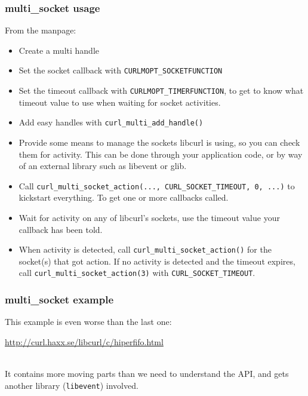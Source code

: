\documentclass[aspectratio=43]{beamer}
\newenvironment{changemargin}[1]{%
  \begin{list}{}{%
    \setlength{\topsep}{0pt}%
    \setlength{\leftmargin}{#1}%
    \setlength{\rightmargin}{1em}
    \setlength{\listparindent}{\parindent}%
    \setlength{\itemindent}{\parindent}%
    \setlength{\parsep}{\parskip}%
  }%
  \item[]}{\end{list}}
\begin{document}
\begin{frame}

  \frametitle{multi\_socket usage}

\begin{changemargin}{1cm}
From the manpage:
\small
\begin{itemize}
\item Create a multi handle

\item Set the socket callback with {\tt CURLMOPT\_SOCKETFUNCTION}

\item Set the timeout callback with {\tt CURLMOPT\_TIMERFUNCTION}, to get to know what timeout value to use when waiting for socket activities.

\item Add easy handles with {\tt curl\_multi\_add\_handle()}

\item Provide some means to manage the sockets libcurl is using, so you can check them for activity. This can be done through your application code, or by way of an external library such as libevent or glib.

\item Call {\tt curl\_multi\_socket\_action(..., CURL\_SOCKET\_TIMEOUT, 0, ...)} to kickstart everything. To get one or more callbacks called.

\item Wait for activity on any of libcurl's sockets, use the timeout value your callback has been told.

\item When activity is detected, call {\tt curl\_multi\_socket\_action()} for the socket(s) that got action. If no activity is detected and the timeout expires, call {\tt curl\_multi\_socket\_action(3)} with {\tt CURL\_SOCKET\_TIMEOUT}. 
\end{itemize}
  \end{changemargin}

\end{frame}

\begin{frame}

  \frametitle{multi\_socket example}

\begin{changemargin}{2cm}
This example is even worse than the last one:
\begin{center}
\url{http://curl.haxx.se/libcurl/c/hiperfifo.html}
\end{center}~\\[1em]
It contains more moving parts than we need to understand the API, and gets
another library ({\tt libevent}) involved.
\end{changemargin}
\end{frame}
\end{document}
